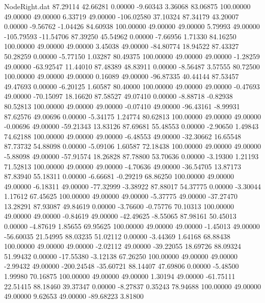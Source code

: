 \begin{filecontents}{NodeRight.dat}
  87.29114   42.66281    0.00000    -9.60343    3.36068   83.06875  100.00000   49.00000   49.00000    6.33719   49.00000 -106.02580   37.10324
  87.34179   43.20007    0.00000    -9.56762   -1.04426   84.60938  100.00000   49.00000   49.00000    5.79993   49.00000 -105.79593  -11.54706
  87.39250   45.54962    0.00000    -7.66956    1.71330   84.16250  100.00000   49.00000   49.00000    3.45038   49.00000  -84.80774   18.94522
  87.43327   50.28259    0.00000    -5.77150    1.03287   80.49375  100.00000   49.00000   49.00000   -1.28259   49.00000  -63.92547   11.44010
  87.48389   48.83911    0.00000    -8.56487    3.57555   80.72500  100.00000   49.00000   49.00000    0.16089   49.00000  -96.87335   40.44144
  87.53457   49.47693    0.00000    -6.20125    1.60587   80.40000  100.00000   49.00000   49.00000   -0.47693   49.00000  -70.15097   18.16620
  87.58527   49.07410    0.00000    -8.88718   -0.82938   80.52813  100.00000   49.00000   49.00000   -0.07410   49.00000  -96.43161   -8.99931
  87.62576   49.00696    0.00000    -5.34175    1.24774   80.62813  100.00000   49.00000   49.00000   -0.00696   49.00000  -59.21343   13.83126
  87.69681   55.48553    0.00000    -2.90650    1.49843   74.62188  100.00000   49.00000   49.00000   -6.48553   49.00000  -32.30662   16.65548
  87.73732   54.88098    0.00000    -5.09106    1.60587   72.18438  100.00000   49.00000   49.00000   -5.88098   49.00000  -57.91574   18.26828
  87.78800   53.70636    0.00000    -3.19300    1.21193   71.52813  100.00000   49.00000   49.00000   -4.70636   49.00000  -36.54705   13.87173
  87.83940   55.18311    0.00000    -6.66681   -0.29219   68.86250  100.00000   49.00000   49.00000   -6.18311   49.00000  -77.32999   -3.38922
  87.88017   54.37775    0.00000    -3.30044    1.17612   67.45625  100.00000   49.00000   49.00000   -5.37775   49.00000  -37.27470   13.28291
  87.93087   49.84619    0.00000    -3.76600   -0.75776   70.10313  100.00000   49.00000   49.00000   -0.84619   49.00000  -42.49625   -8.55065
  87.98161   50.45013    0.00000    -4.87619    1.85655   69.95625  100.00000   49.00000   49.00000   -1.45013   49.00000  -56.60035   21.54995
  88.03235   51.02112    0.00000    -3.44369    1.64168   68.88438  100.00000   49.00000   49.00000   -2.02112   49.00000  -39.22055   18.69726
  88.09324   51.99432    0.00000   -17.55380   -3.12138   67.26250  100.00000   49.00000   49.00000   -2.99432   49.00000 -200.24548  -35.60721
  88.14407   47.69806    0.00000    -5.48500    1.99980   70.16875  100.00000   49.00000   49.00000    1.30194   49.00000  -61.75111   22.51415
  88.18460   39.37347    0.00000    -8.27837    0.35243   78.94688  100.00000   49.00000   49.00000    9.62653   49.00000  -89.68223    3.81800

\end{filecontents}
